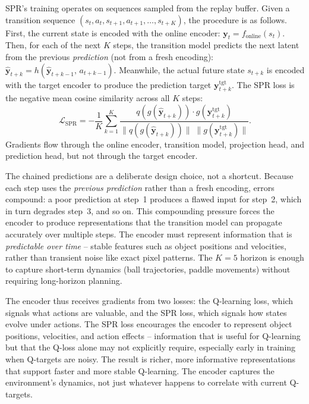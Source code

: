 


\smallskip
SPR's training operates on sequences sampled from the replay
buffer. Given a transition sequence
$(s_t, a_t, s_{t+1}, a_{t+1}, \ldots, s_{t+K})$, the procedure
is as follows. First, the current state is encoded with the
online encoder:
$\mathbf{y}_t = f_{\text{online}}(s_t)$. Then, for each of the
next $K$ steps, the transition model predicts the next latent from
the previous \emph{prediction} (not from a fresh encoding):
$\hat{\mathbf{y}}_{t+k} = h(\hat{\mathbf{y}}_{t+k-1},\, a_{t+k-1})$.
Meanwhile, the actual future state $s_{t+k}$ is encoded with the
target encoder to produce the prediction target
$\mathbf{y}^{\text{tgt}}_{t+k}$. The SPR loss is the negative mean
cosine similarity across all $K$ steps:
\begin{equation}
\label{eq:spr-loss}
\mathcal{L}_{\text{SPR}}
  = -\frac{1}{K} \sum_{k=1}^{K}
    \frac{q(g(\hat{\mathbf{y}}_{t+k})) \cdot
          g(\mathbf{y}^{\text{tgt}}_{t+k})}
         {\|q(g(\hat{\mathbf{y}}_{t+k}))\|\;
          \|g(\mathbf{y}^{\text{tgt}}_{t+k})\|}.
\end{equation}
Gradients flow through the online encoder, transition model,
projection head, and prediction head, but not through the target
encoder.

\smallskip
The chained predictions are a deliberate design choice, not a
shortcut. Because each step uses the \emph{previous prediction}
rather than a fresh encoding, errors compound: a poor prediction at
step~1 produces a flawed input for step~2, which in turn degrades
step~3, and so on. This compounding pressure forces the encoder to
produce representations that the transition model can propagate
accurately over multiple steps. The encoder must represent
information that is \emph{predictable over time} -- stable features
such as object positions and velocities, rather than transient
noise like exact pixel patterns. The $K = 5$ horizon is enough to
capture short-term dynamics (ball trajectories, paddle movements)
without requiring long-horizon planning.

\smallskip
The encoder thus receives gradients from two losses: the Q-learning
loss, which signals what actions are valuable, and the SPR loss,
which signals how states evolve under actions. The SPR loss
encourages the encoder to represent object positions, velocities,
and action effects -- information that is useful for Q-learning but
that the Q-loss alone may not explicitly require, especially early
in training when Q-targets are noisy. The result is richer, more
informative representations that support faster and more stable
Q-learning. The encoder captures the environment's dynamics, not
just whatever happens to correlate with current Q-targets.

